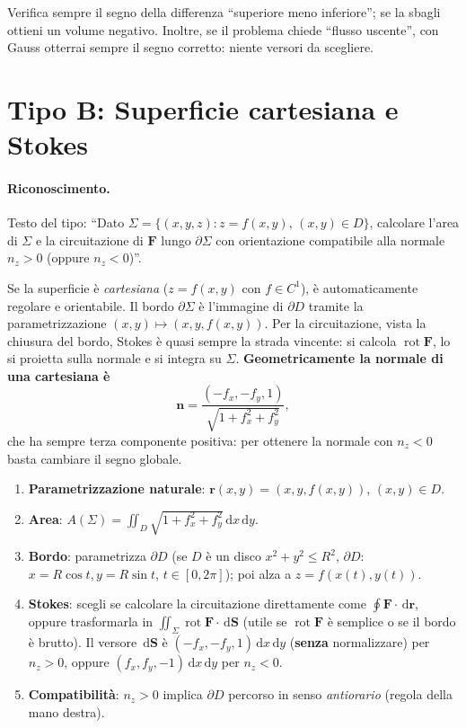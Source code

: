 \documentclass[11pt,a4paper,openany]{book}
\theoremstyle{plain}
\theoremstyle{definition}
\theoremstyle{remark}
\newcommand{\dd}{\,\mathrm{d}}
\newcommand{\Rot}{\operatorname{rot}}
\renewcommand{\vec}[1]{\mathbf{#1}}
\newcommand{\F}{\mathbf{F}}
\newcommand{\rr}{\mathbf{r}}
\begin{document}
\begin{trappola}
Verifica sempre il segno della differenza ``superiore meno inferiore'';
se la sbagli ottieni un volume negativo. Inoltre, se il problema chiede
``flusso uscente'', con Gauss otterrai sempre il segno corretto: niente
versori da scegliere.
\end{trappola}

\section{Tipo B: Superficie cartesiana e Stokes}

\paragraph{Riconoscimento.} Testo del tipo:
``Dato $\Sigma=\{(x,y,z):z=f(x,y),\,(x,y)\in D\}$, calcolare l'area di
$\Sigma$ e la circuitazione di $\F$ lungo $\partial\Sigma$ con
orientazione compatibile alla normale $n_z>0$ (oppure $n_z<0$)''.

\begin{nota}[title={Intuizione}]
Se la superficie \`e \emph{cartesiana} ($z=f(x,y)$ con $f\in C^1$),
\`e automaticamente regolare e orientabile. Il bordo $\partial\Sigma$
\`e l'immagine di $\partial D$ tramite la parametrizzazione
$(x,y)\mapsto(x,y,f(x,y))$. Per la circuitazione, vista la chiusura
del bordo, Stokes \`e quasi sempre la strada vincente: si calcola
$\Rot\F$, lo si proietta sulla normale e si integra su $\Sigma$.
\textbf{Geometricamente la normale di una cartesiana \`e}
\[
\vec n=\frac{(-f_x,-f_y,1)}{\sqrt{1+f_x^2+f_y^2}},
\]
che ha sempre terza componente positiva: per ottenere la normale con
$n_z<0$ basta cambiare il segno globale.
\end{nota}

\begin{ricetta}[title={Cartesiana + Stokes}]
\begin{enumerate}
\item \textbf{Parametrizzazione naturale}:
   $\rr(x,y)=(x,y,f(x,y))$, $(x,y)\in D$.
\item \textbf{Area}: $A(\Sigma)=\iint_D\sqrt{1+f_x^2+f_y^2}\dd x\dd y$.
\item \textbf{Bordo}: parametrizza $\partial D$ (se $D$ \`e un disco
   $x^2+y^2\le R^2$, $\partial D$: $x=R\cos t,y=R\sin t$, $t\in[0,2\pi]$);
   poi alza a $z=f(x(t),y(t))$.
\item \textbf{Stokes}: scegli se calcolare la circuitazione
   direttamente come $\oint\F\cdot\dd\rr$, oppure trasformarla in
   $\iint_\Sigma\Rot\F\cdot\dd\vec S$ (utile se $\Rot\F$ \`e semplice
   o se il bordo \`e brutto). Il versore $\dd\vec S$ \`e
   $(-f_x,-f_y,1)\dd x\dd y$ (\textbf{senza} normalizzare\!) per
   $n_z>0$, oppure $(f_x,f_y,-1)\dd x\dd y$ per $n_z<0$.
\item \textbf{Compatibilit\`a}: $n_z>0$ implica $\partial D$ percorso
   in senso \emph{antiorario} (regola della mano destra).
\end{enumerate}
\end{ricetta}
\end{document}
